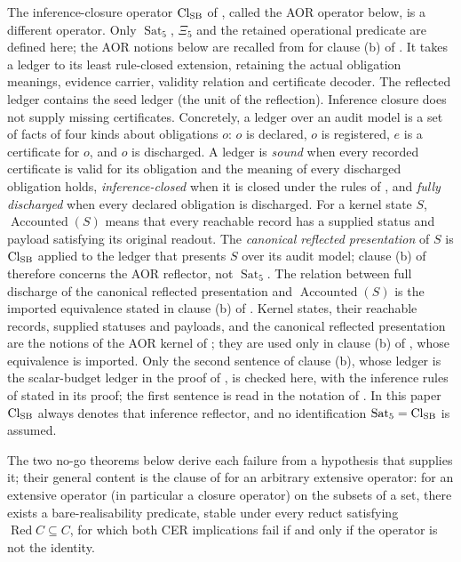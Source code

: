 \begin{definition}
The inference-closure operator \(\mathrm{Cl}_{\mathrm{SB}}\) of \PaperAOR, called the AOR operator below, is a different operator. Only \(\operatorname{Sat}_5\), \(\Xi_5\) and the retained operational predicate are defined here; the AOR notions below are recalled from \citet{Tsiokos2026AOR} for clause (b) of . It takes a ledger to its
least rule-closed extension, retaining the actual obligation meanings,
evidence carrier, validity relation and certificate decoder. The reflected ledger
contains the seed ledger (the unit of the reflection). Inference closure does not supply missing
certificates. Concretely, a ledger over an audit model is a set of facts of
four kinds about obligations \(o\): \(o\) is declared, \(o\) is registered, \(e\)
is a certificate for \(o\), and \(o\) is discharged. A ledger is \emph{sound}
when every recorded certificate is valid for its obligation and the
meaning of every discharged obligation holds,
\emph{inference-closed} when it is closed under the rules of \PaperAOR, and
\emph{fully discharged} when every declared obligation is discharged. For a kernel state \(S\), \(\operatorname{Accounted}(S)\)
means that every reachable record has a supplied status and payload satisfying
its original readout. The \emph{canonical reflected presentation} of \(S\) is \(\mathrm{Cl}_{\mathrm{SB}}\) applied to the ledger that presents \(S\) over its audit model; clause (b) of  therefore concerns the AOR reflector, not \(\operatorname{Sat}_5\). The relation between full discharge of the canonical reflected presentation and \(\operatorname{Accounted}(S)\) is the imported equivalence stated in clause (b) of  \citep{Tsiokos2026AOR}. Kernel states, their reachable records, supplied
statuses and payloads, and the canonical reflected presentation are the
notions of the AOR kernel of \citet{Tsiokos2026AOR}; they are used only in
clause (b) of , whose equivalence is imported. Only the second sentence of clause (b), whose ledger is the scalar-budget ledger in the proof of , is checked here, with the inference rules of \citet{Tsiokos2026AOR} stated in its proof; the first sentence is read in the notation of \citet{Tsiokos2026AOR}. In this paper
\(\mathrm{Cl}_{\mathrm{SB}}\) always denotes that inference reflector, and no identification
\(\operatorname{Sat}_5=\mathrm{Cl}_{\mathrm{SB}}\) is assumed.
\end{definition}

The two no-go theorems below derive each failure from a hypothesis that
supplies it; their general content is the clause of
 for an arbitrary extensive operator: for an
extensive operator (in particular a closure operator) on the subsets of a set,
there exists a bare-realisability predicate, stable under every reduct
satisfying \(\operatorname{Red}C\subseteq C\), for which both CER implications
fail if and only if the operator is not the identity.

